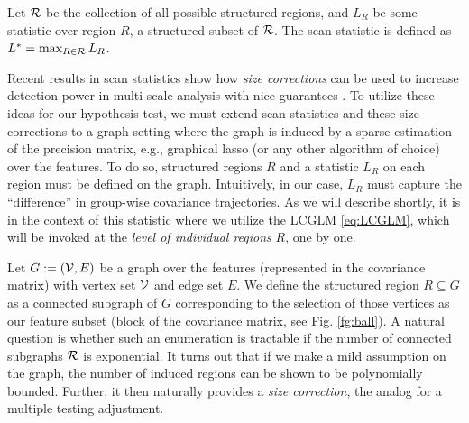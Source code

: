 \begin{definition} Let $\mathcal{R}$ be the collection of all possible structured regions, and $L_R$ be some statistic over region $R$, a structured subset of $\mathcal{R}$. The scan statistic is defined as $L^* = \max_{R\in\mathcal{R}} L_R$.
\end{definition}
Recent results in scan statistics show how \textit{size corrections} can be used to increase detection power in multi-scale analysis with 
nice guarantees \citep{walther2010optimal,wang2016structured}. 
%
To utilize these ideas for our hypothesis test, we must extend scan statistics and these size corrections to a graph setting 
where the graph is induced by a sparse estimation of the precision matrix, e.g., graphical lasso (or any other algorithm of choice) over the features.
To do so, structured regions $R$ and a statistic $L_R$ on each region must be defined on the graph. Intuitively, in our case, 
$L_R$ must capture the ``difference'' in group-wise covariance trajectories. 
As we will describe shortly, it is in the context of this statistic where we utilize the LCGLM \eqref{eq:LCGLM}, which will be invoked at the {\em level of individual regions} $R$, one by one. 

Let $G:=(\mathcal{V},E)$ be a graph over the features (represented in the covariance matrix) with vertex set $\mathcal{V}$ and edge set $E$. 
We define the structured region $R \subseteq G$ as a connected subgraph of $G$ corresponding to the 
selection of those vertices as our feature subset (block of the covariance matrix, see Fig. \ref{fg:ball}). 
A natural question is whether such an enumeration is tractable 
if the number of connected subgraphs $\mathcal{R}$ is exponential. It turns out that if we make a mild assumption on the graph, 
the number of induced regions can be shown to be polynomially bounded. Further, it then naturally provides a {\em size correction}, the analog for a multiple testing adjustment. 


